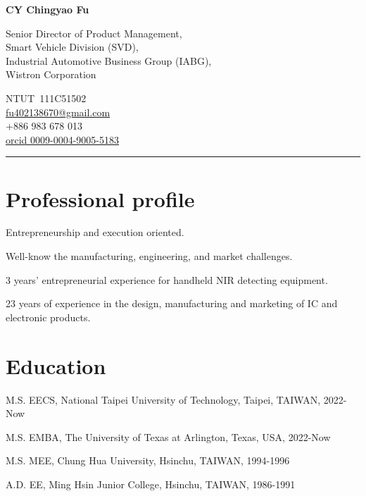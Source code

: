\documentclass[12pt,a4paper]{report}
\newcommand{\myname}{CY Chingyao Fu}
\newcommand{\namefont}[1]{{\normalfont\bfseries\Huge{#1}}}
\begin{document}
    \raggedright{}

    \namefont{\myname}

    \vspace{1em}
    \begin{minipage}[t]{0.7\textwidth}
        Senior Director of Product Management,\\
        Smart Vehicle Division (SVD),\\
        Industrial Automotive Business Group (IABG),\\
        Wistron Corporation
    \end{minipage}
    \begin{minipage}[t]{0.295\textwidth}
        \flushright{}
        NTUT\ 111C51502\\
        \href{mailto:fu402138670@gmail.com}{fu402138670@gmail.com} \\
        +886 983 678 013 \\
        \href{https://orcid.org/0009-0004-9005-5183}
        {orcid 0009-0004-9005-5183}
    \end{minipage}
    \vspace{1em}
    \hrule
    
    \section*{Professional profile}
        \begin{tablist}
        \item Entrepreneurship and execution oriented. 
        \item Well-know the manufacturing, engineering, and market challenges. 
        \item 3 years’ entrepreneurial experience for handheld NIR detecting equipment. 
        \item 23 years of experience in the design, manufacturing and marketing of IC and electronic products. 
        \end{tablist}
    
    \section*{Education}
    
    \begin{tablist}
      \item[M.S.] \tab{}EECS, National Taipei University of Technology, Taipei, TAIWAN, 2022-Now
      \item[M.S.] \tab{}EMBA, The University of Texas at Arlington, Texas, USA, 2022-Now
      \item[M.S.] \tab{}MEE, Chung Hua University, Hsinchu, TAIWAN, 1994-1996
      \item[A.D.] \tab{}EE, Ming Hsin Junior College, Hsinchu, TAIWAN, 1986-1991
    \end{tablist}
\end{document}
